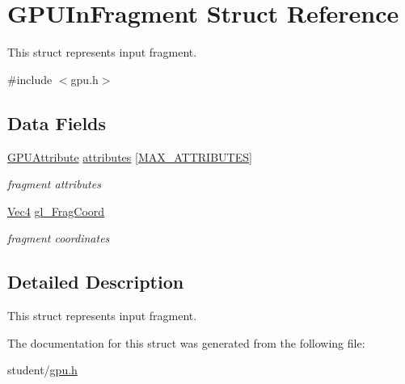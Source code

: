 \hypertarget{structGPUInFragment}{}\section{G\+P\+U\+In\+Fragment Struct Reference}
\label{structGPUInFragment}


This struct represents input fragment.  




{\ttfamily \#include $<$gpu.\+h$>$}

\subsection*{Data Fields}
\begin{DoxyCompactItemize}
\item 
\mbox{\label{structGPUInFragment_a13e49e13c4a42f0dfd30001421b22dc5}} 
\hyperlink{structGPUAttribute}{G\+P\+U\+Attribute} \hyperlink{structGPUInFragment_a13e49e13c4a42f0dfd30001421b22dc5}{attributes} \mbox{[}\hyperlink{student_2fwd_8h_a4d992a1f9192388588184753115f6c03}{M\+A\+X\+\_\+\+A\+T\+T\+R\+I\+B\+U\+T\+ES}\mbox{]}
\begin{DoxyCompactList}\small\item\em fragment attributes \end{DoxyCompactList}\item 
\mbox{\label{structGPUInFragment_a71421b9a8f6411a76d31c463e8904b96}} 
\hyperlink{structVec4}{Vec4} \hyperlink{structGPUInFragment_a71421b9a8f6411a76d31c463e8904b96}{gl\+\_\+\+Frag\+Coord}
\begin{DoxyCompactList}\small\item\em fragment coordinates \end{DoxyCompactList}\end{DoxyCompactItemize}


\subsection{Detailed Description}
This struct represents input fragment. 

The documentation for this struct was generated from the following file\+:\begin{DoxyCompactItemize}
\item 
student/\hyperlink{gpu_8h}{gpu.\+h}\end{DoxyCompactItemize}
